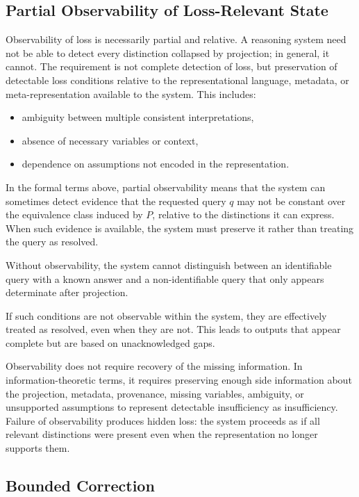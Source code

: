 \documentclass[11pt]{article}
\theoremstyle{definition}
\theoremstyle{remark}
\begin{document}
\subsection{Partial Observability of Loss-Relevant State}

Observability of loss is necessarily partial and relative. A reasoning system need not be able to detect every distinction collapsed by projection; in general, it cannot. The requirement is not complete detection of loss, but preservation of detectable loss conditions relative to the representational language, metadata, or meta-representation available to the system. This includes:

\begin{itemize}[leftmargin=1.5em]
    \item ambiguity between multiple consistent interpretations,
    \item absence of necessary variables or context,
    \item dependence on assumptions not encoded in the representation.
\end{itemize}

In the formal terms above, partial observability means that the system can sometimes detect evidence that the requested query $q$ may not be constant over the equivalence class induced by $P$, relative to the distinctions it can express. When such evidence is available, the system must preserve it rather than treating the query as resolved.

Without observability, the system cannot distinguish between an identifiable query with a known answer and a non-identifiable query that only appears determinate after projection.

If such conditions are not observable within the system, they are effectively treated as resolved, even when they are not. This leads to outputs that appear complete but are based on unacknowledged gaps.

Observability does not require recovery of the missing information. In information-theoretic terms, it requires preserving enough side information about the projection, metadata, provenance, missing variables, ambiguity, or unsupported assumptions to represent detectable insufficiency as insufficiency. Failure of observability produces hidden loss: the system proceeds as if all relevant distinctions were present even when the representation no longer supports them.

\subsection{Bounded Correction}
\end{document}
